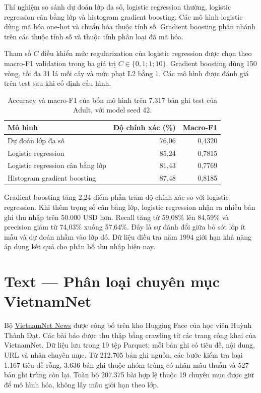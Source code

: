\documentclass[12pt,a4paper]{report}
\begin{document}
Thí nghiệm so sánh dự đoán lớp đa số, logistic regression thường, logistic regression cân bằng lớp và histogram gradient boosting. Các mô hình logistic dùng mã hóa one-hot và chuẩn hóa thuộc tính số. Gradient boosting phân nhánh trên các thuộc tính số và thuộc tính phân loại đã mã hóa.

Tham số $C$ điều khiển mức regularization của logistic regression được chọn theo macro-F1 validation trong ba giá trị $C\in\{0{,}1;1;10\}$. Gradient boosting dùng 150 vòng, tối đa 31 lá mỗi cây và mức phạt L2 bằng 1. Các mô hình được đánh giá trên test sau khi cố định cấu hình.

\begin{table}[htbp]\centering
\begin{tabular}{@{}lrr@{}}\toprule
Mô hình & Độ chính xác (\%) & Macro-F1\\\midrule
Dự đoán lớp đa số & 76,06 & 0,4320\\
Logistic regression & 85,24 & 0,7815\\
Logistic regression cân bằng lớp & 81,43 & 0,7769\\
Histogram gradient boosting & 87,48 & 0,8185\\\bottomrule
\end{tabular}
\caption{Accuracy và macro-F1 của bốn mô hình trên 7.317 bản ghi test của Adult, với model seed 42.}
\end{table}

Gradient boosting tăng 2,24 điểm phần trăm độ chính xác so với logistic regression. Khi thêm trọng số cân bằng lớp, logistic regression nhận ra nhiều bản ghi thu nhập trên 50.000 USD hơn. Recall tăng từ 59,08\% lên 84,59\% và precision giảm từ 74,03\% xuống 57,64\%. Đây là sự đánh đổi giữa bỏ sót lớp ít mẫu và dự đoán nhầm vào lớp đó. Dữ liệu điều tra năm 1994 giới hạn khả năng áp dụng kết quả cho phân bố thu nhập hiện nay.

\section{Text — Phân loại chuyên mục VietnamNet}
Bộ \href{https://huggingface.co/datasets/dathuynh1108/vietnamnet-news}{VietnamNet News} được công bố trên kho Hugging Face của học viên Huỳnh Thành Đạt. Các bài báo được thu thập bằng crawling từ các trang công khai của VietnamNet. Dữ liệu lưu trong 19 tệp Parquet; mỗi bản ghi có tiêu đề, nội dung, URL và nhãn chuyên mục. Từ 212.705 bản ghi nguồn, các bước kiểm tra loại 1.167 tiêu đề rỗng, 3.636 bản ghi thuộc nhóm trùng có nhãn mâu thuẫn và 527 bản ghi trùng còn lại. Toàn bộ 207.375 bài hợp lệ thuộc 19 chuyên mục được giữ để mô hình hóa, không lấy mẫu giới hạn theo lớp.
\end{document}
